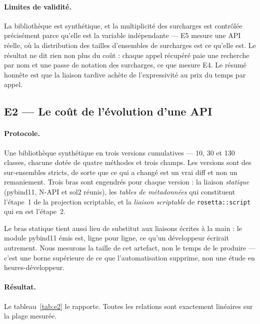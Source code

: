 \documentclass[11pt,a4paper]{article}
\newcommand{\code}[1]{\texttt{\small #1}}
\begin{document}
\paragraph{Limites de validité.} La bibliothèque est synthétique, et la
multiplicité des surcharges est contrôlée précisément parce qu'elle est la
variable indépendante --- E5 mesure une API réelle, où la distribution des
tailles d'ensembles de surcharges est ce qu'elle est. Le résultat ne dit rien non
plus du coût : chaque appel récupéré paie une recherche par nom et une passe de
notation des surcharges, ce que mesure E4. Le résumé honnête est que la liaison
tardive achète de l'expressivité au prix du temps par appel.

\subsection{E2 --- Le coût de l'évolution d'une API}
\label{sec:e2}

\paragraph{Protocole.} Une bibliothèque synthétique en trois versions cumulatives
--- 10, 30 et 130 classes, chacune dotée de quatre méthodes et trois champs. Les
versions sont des sur-ensembles stricts, de sorte que \og ce qui a changé \fg{}
est un vrai diff et non un remaniement. Trois bras sont engendrés pour chaque
version : la liaison \emph{statique} (pybind11, N-API et sol2 réunis), les
\emph{tables de métadonnées} qui constituent l'étape~1 de la projection
scriptable, et la \emph{liaison scriptable} de \code{rosetta::script} qui en est
l'étape~2.

Le bras statique tient aussi lieu de substitut aux liaisons écrites à la main :
le module pybind11 émis est, ligne pour ligne, ce qu'un développeur écrirait
autrement. Nous mesurons la taille de cet artefact, non le temps de le produire
--- c'est une borne supérieure de ce que l'automatisation supprime, non une étude
en heures-développeur.

\paragraph{Résultat.} Le tableau~\ref{tab:e2} le rapporte. Toutes les relations
sont exactement linéaires sur la plage mesurée.
\end{document}
